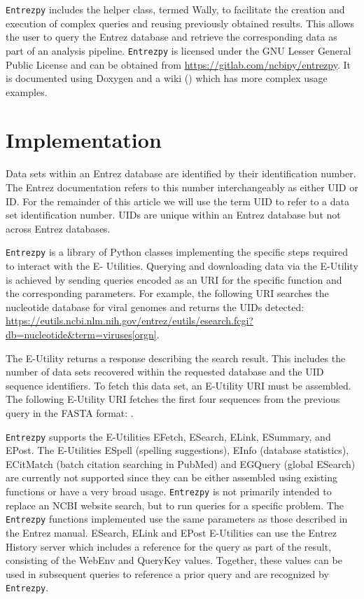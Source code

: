 \documentclass[a4paper]{article}
\newcommand{\entrezpy}{\texttt{Entrezpy}\xspace}
\begin{document}
\entrezpy includes the helper class, termed Wally, to facilitate the creation
and execution of complex queries and reusing previously obtained results. This
allows the user to query the Entrez database and retrieve the corresponding
data as part of an analysis pipeline. \entrezpy is licensed under the GNU Lesser
General Public License and can be obtained from
\url{https://gitlab.com/ncbipy/entrezpy}. It is documented using Doxygen and a
wiki () which has more
complex usage examples.

\section{Implementation}
Data sets within an Entrez database are identified by their identification
number. The Entrez documentation refers to this number interchangeably as
either UID or ID. For the remainder of this article we will use the term UID to
refer to a data set identification number. UIDs are unique within an Entrez
database but not across Entrez databases.

\entrezpy is a library of Python classes implementing the specific steps
required to interact with the E- Utilities. Querying and downloading data via
the E-Utility is achieved by sending queries encoded as an URI for the specific
function and the corresponding parameters. For example, the following URI
searches the nucleotide database for viral genomes and returns the UIDs
detected:
\url{https://eutils.ncbi.nlm.nih.gov/entrez/eutils/esearch.fcgi?db=nucleotide&term=viruses[orgn]}.

The E-Utility returns a response describing the search result. This includes
the number of data sets recovered within the requested database and the UID
sequence identifiers. To fetch this data set, an E-Utility URI must be
assembled. The following E-Utility URI fetches the first four sequences from
the previous query in the FASTA format:
.

\entrezpy supports the E-Utilities EFetch, ESearch, ELink, ESummary, and EPost.
The E-Utilities ESpell (spelling suggestions), EInfo (database statistics),
ECitMatch (batch citation searching in PubMed) and EGQuery (global ESearch) are
currently not supported since they can be either assembled using existing
functions or have a very broad usage. \entrezpy is not primarily intended to
replace an NCBI website search, but to run queries for a specific problem. The
\entrezpy functions implemented use the same parameters as those described in
the Entrez manual. ESearch, ELink and EPost E-Utilities can use the Entrez
History server which includes a reference for the query as part of the result,
consisting of the WebEnv and QueryKey values. Together, these values can be
used in subsequent queries to reference a prior query and are recognized by
\entrezpy.
\end{document}
